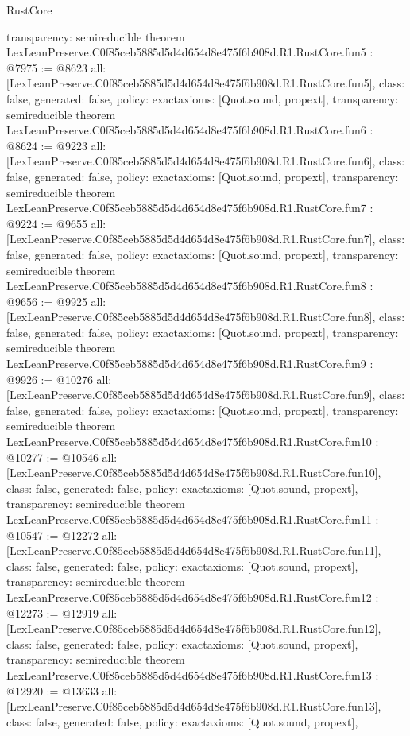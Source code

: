 \begin{lexlean}{RustCore}
\begin{coremodule}
{  transparency: semireducible
}
theorem LexLeanPreserve.C0f85ceb5885d5d4d654d8e475f6b908d.R1.RustCore.fun5 : @7975 := @8623 {
  all: [LexLeanPreserve.C0f85ceb5885d5d4d654d8e475f6b908d.R1.RustCore.fun5],
  class: false,
  generated: false,
  policy: exact{axioms: [Quot.sound, propext]},
  transparency: semireducible
}
theorem LexLeanPreserve.C0f85ceb5885d5d4d654d8e475f6b908d.R1.RustCore.fun6 : @8624 := @9223 {
  all: [LexLeanPreserve.C0f85ceb5885d5d4d654d8e475f6b908d.R1.RustCore.fun6],
  class: false,
  generated: false,
  policy: exact{axioms: [Quot.sound, propext]},
  transparency: semireducible
}
theorem LexLeanPreserve.C0f85ceb5885d5d4d654d8e475f6b908d.R1.RustCore.fun7 : @9224 := @9655 {
  all: [LexLeanPreserve.C0f85ceb5885d5d4d654d8e475f6b908d.R1.RustCore.fun7],
  class: false,
  generated: false,
  policy: exact{axioms: [Quot.sound, propext]},
  transparency: semireducible
}
theorem LexLeanPreserve.C0f85ceb5885d5d4d654d8e475f6b908d.R1.RustCore.fun8 : @9656 := @9925 {
  all: [LexLeanPreserve.C0f85ceb5885d5d4d654d8e475f6b908d.R1.RustCore.fun8],
  class: false,
  generated: false,
  policy: exact{axioms: [Quot.sound, propext]},
  transparency: semireducible
}
theorem LexLeanPreserve.C0f85ceb5885d5d4d654d8e475f6b908d.R1.RustCore.fun9 : @9926 := @10276 {
  all: [LexLeanPreserve.C0f85ceb5885d5d4d654d8e475f6b908d.R1.RustCore.fun9],
  class: false,
  generated: false,
  policy: exact{axioms: [Quot.sound, propext]},
  transparency: semireducible
}
theorem LexLeanPreserve.C0f85ceb5885d5d4d654d8e475f6b908d.R1.RustCore.fun10 : @10277 := @10546 {
  all: [LexLeanPreserve.C0f85ceb5885d5d4d654d8e475f6b908d.R1.RustCore.fun10],
  class: false,
  generated: false,
  policy: exact{axioms: [Quot.sound, propext]},
  transparency: semireducible
}
theorem LexLeanPreserve.C0f85ceb5885d5d4d654d8e475f6b908d.R1.RustCore.fun11 : @10547 := @12272 {
  all: [LexLeanPreserve.C0f85ceb5885d5d4d654d8e475f6b908d.R1.RustCore.fun11],
  class: false,
  generated: false,
  policy: exact{axioms: [Quot.sound, propext]},
  transparency: semireducible
}
theorem LexLeanPreserve.C0f85ceb5885d5d4d654d8e475f6b908d.R1.RustCore.fun12 : @12273 := @12919 {
  all: [LexLeanPreserve.C0f85ceb5885d5d4d654d8e475f6b908d.R1.RustCore.fun12],
  class: false,
  generated: false,
  policy: exact{axioms: [Quot.sound, propext]},
  transparency: semireducible
}
theorem LexLeanPreserve.C0f85ceb5885d5d4d654d8e475f6b908d.R1.RustCore.fun13 : @12920 := @13633 {
  all: [LexLeanPreserve.C0f85ceb5885d5d4d654d8e475f6b908d.R1.RustCore.fun13],
  class: false,
  generated: false,
  policy: exact{axioms: [Quot.sound, propext]},
}
\end{coremodule}
\end{lexlean}
